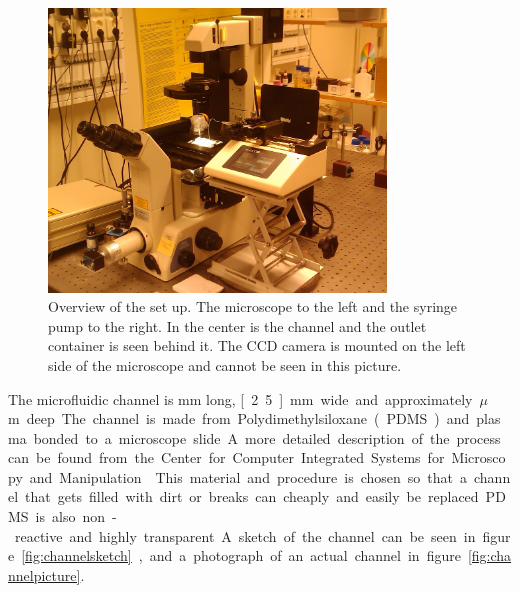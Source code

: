 \begin{figure}[H]
\centering
\includegraphics[width=0.8\textwidth]{figures/method/ExperimentalOverview.jpg}
\caption{Overview of the set up. The microscope to the left and the syringe pump to the right. In the center is the channel and the outlet container is seen behind it. The CCD camera is mounted on the left side of the microscope and cannot be seen in this picture.}\label{fig:setuppicture}
\end{figure}


The microfluidic channel is \unit[40]{mm} long, \unit[2.5]{mm} wide and approximately \unit[150]{$\mu$m} deep. The channel is made from Polydimethylsiloxane (PDMS) and plasma bonded to a microscope slide. A more detailed description of the process can be found from the Center for Computer Integrated Systems for Microscopy and Manipulation~\cite{PDMS}. This material and procedure is chosen so that a channel that gets filled with dirt or breaks can cheaply and easily be replaced. PDMS is also non-reactive and highly transparent. A sketch of the channel can be seen in figure \ref{fig:channelsketch}, and a photograph of an actual channel in figure \ref{fig:channelpicture}. 

